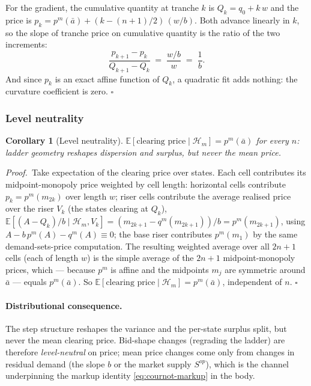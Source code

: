 \documentclass[11pt,a4paper]{article}
\newtheorem{corollary}{Corollary}
\theoremstyle{definition}
\theoremstyle{remark}
\theoremstyle{plain}
\begin{document}
For the gradient, the cumulative quantity at tranche $k$ is $Q_k = q_0 + k\,w$ and the price is $p_k = p^m(\bar a) + (k - (n+1)/2)\,(w/b)$. Both advance linearly in $k$, so the slope of tranche price on cumulative quantity is the ratio of the two increments:
\[
\frac{p_{k+1} - p_k}{Q_{k+1} - Q_k} \;=\; \frac{w/b}{w} \;=\; \frac{1}{b}.
\]
And since $p_k$ is an exact affine function of $Q_k$, a quadratic fit adds nothing: the curvature coefficient is zero. $\square$

\subsubsection{Level neutrality}\label{app:tranche:level}

\begin{corollary}[Level neutrality]\label{rem:level}
$\mathbb{E}[\text{clearing price} \mid \mathcal{H}_m] = p^m(\bar a)$ for every $n$: ladder geometry reshapes dispersion and surplus, but never the mean price.
\end{corollary}

\noindent\textit{Proof.}\ Take expectation of the clearing price over states. Each cell contributes its midpoint-monopoly price weighted by cell length: horizontal cells contribute $p_k = p^m(m_{2k})$ over length $w$; riser cells contribute the average realised price over the riser $V_k$ (the states clearing at $Q_k$), $\mathbb{E}[(A - Q_k)/b \mid \mathcal{H}_m, V_k] = (m_{2k+1} - q^m(m_{2k+1}))/b = p^m(m_{2k+1})$, using $A - b\,p^m(A) - q^m(A) \equiv 0$; the base riser contributes $p^m(m_1)$ by the same demand-sets-price computation. The resulting weighted average over all $2n+1$ cells (each of length $w$) is the simple average of the $2n+1$ midpoint-monopoly prices, which --- because $p^m$ is affine and the midpoints $m_j$ are symmetric around $\bar a$ --- equals $p^m(\bar a)$. So $\mathbb{E}[\text{clearing price} \mid \mathcal{H}_m] = p^m(\bar a)$, independent of $n$. $\square$

\paragraph{Distributional consequence.} The step structure reshapes the variance and the per-state surplus split, but never the mean clearing price. Bid-shape changes (regrading the ladder) are therefore \emph{level-neutral} on price; mean price changes come only from changes in residual demand (the slope $b$ or the market supply $S^{op}$), which is the channel underpinning the markup identity \eqref{eq:cournot-markup} in the body.
\end{document}

